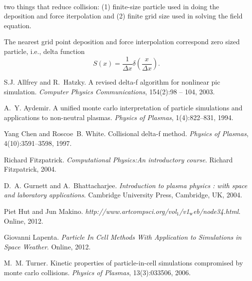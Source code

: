 \documentclass{article}
\newcommand{\tmrsub}[1]{\ensuremath{_{\textrm{#1}}}}
\newcommand{\tmtextit}[1]{{\itshape{#1}}}
\begin{document}
\

two things that reduce collision: (1) finite-size particle used in doing the
deposition and force iterpolation and (2) finite grid size used in solving the
field equation.

The nearest grid point deposition and force interpolation correspond zero
sized particle, i.e., delta function
\begin{equation}
  S (x) = \frac{1}{\Delta x} \delta \left( \frac{x}{\Delta x} \right) .
\end{equation}


\begin{thebibliography}{1}
  S.J. Allfrey and R.~Hatzky. {\newblock}A revised
  delta-f algorithm for nonlinear pic simulation.
  {\newblock}\tmtextit{Computer Physics Communications}, 154(2):98 -- 104,
  2003.
  
  A.~Y. Aydemir. {\newblock}A unified monte carlo
  interpretation of particle simulations and applications to non-neutral
  plasmas. {\newblock}\tmtextit{Physics of Plasmas}, 1(4):822--831, 1994.
  
  Yang Chen and Roscoe~B. White. {\newblock}Collisional
  delta-f method. {\newblock}\tmtextit{Physics of Plasmas}, 4(10):3591--3598,
  1997.
  
  Richard Fitzpatrick.
  {\newblock}\tmtextit{Computational Physics:An introductory course}.
  {\newblock}Richard Fitzpatrick, 2004.
  
  D.~A. Gurnett and A.~Bhattacharjee.
  {\newblock}\tmtextit{Introduction to plasma physics : with space and
  laboratory applications}. {\newblock}Cambridge University Press, Cambridge,
  UK, 2004.
  
  Piet Hut and Jun Makino.
  {\newblock}\tmtextit{http://www.artcompsci.org/vol\tmrsub{1}/v1\tmrsub{w}eb/node34.html}.
  {\newblock}Online, 2012.
  
  Giovanni Lapenta. {\newblock}\tmtextit{Particle In
  Cell Methods With Application to Simulations in Space Weather}.
  {\newblock}Online, 2012.
  
  M.~M. Turner. {\newblock}Kinetic properties of
  particle-in-cell simulations compromised by monte carlo collisions.
  {\newblock}\tmtextit{Physics of Plasmas}, 13(3):033506, 2006.
\end{thebibliography}

\

\

\

\

\

\

\

\

\

\
\end{document}
